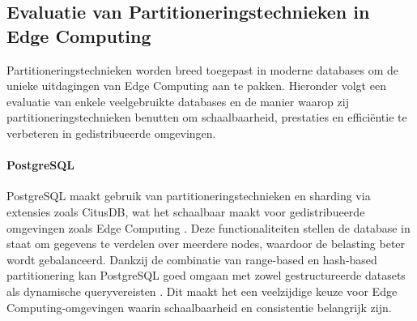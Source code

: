 \begin{table}[H]
    \centering
    \caption{Overzicht van de specificaties van MongoDB. \cite{MongoDBDocumentation}}
\end{table}

\subsection{Evaluatie van Partitioneringstechnieken in Edge Computing}

Partitioneringstechnieken worden breed toegepast in moderne databases om de unieke uitdagingen van Edge Computing aan te pakken. Hieronder volgt een evaluatie van enkele veelgebruikte databases en de manier waarop zij partitioneringstechnieken benutten om schaalbaarheid, prestaties en efficiëntie te verbeteren in gedistribueerde omgevingen.

\paragraph{PostgreSQL}  
PostgreSQL maakt gebruik van partitioneringstechnieken en sharding via extensies zoals CitusDB, wat het schaalbaar maakt voor gedistribueerde omgevingen zoals Edge Computing \autocite{PostgreSQLDocumentation}. Deze functionaliteiten stellen de database in staat om gegevens te verdelen over meerdere nodes, waardoor de belasting beter wordt gebalanceerd. Dankzij de combinatie van range-based en hash-based partitionering kan PostgreSQL goed omgaan met zowel gestructureerde datasets als dynamische queryvereisten \autocite{Kleppmann2017}. Dit maakt het een veelzijdige keuze voor Edge Computing-omgevingen waarin schaalbaarheid en consistentie belangrijk zijn.

